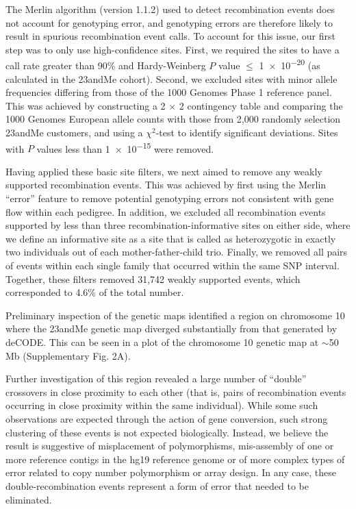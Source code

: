 The Merlin algorithm (version 1.1.2) used to detect recombination events does
not account for genotyping error, and genotyping errors are therefore likely to
result in spurious recombination event calls. To account for this issue, our first step
was to only use high-confidence sites. First, we required the sites to have a call rate
greater than 90\% and Hardy-Weinberg $P$ value $\le$ \num{1e-20} (as calculated in the
23andMe cohort). Second, we excluded sites with minor allele frequencies differing
from those of the 1000 Genomes Phase 1 reference panel\cite{1000G2012}. This was achieved by
constructing a 2 $\times$ 2 contingency table and comparing the 1000 Genomes
European allele counts with those from 2,000 randomly selection 23andMe
customers, and using a $\chi^2$-test to identify significant deviations. Sites with $P$ values
less than \num{1e-15} were removed.

Having applied these basic site filters, we next aimed to remove any weakly
supported recombination events. This was achieved by first using the Merlin ``error''
feature to remove potential genotyping errors not consistent with gene flow within
each pedigree. In addition, we excluded all recombination events supported by less
than three recombination-informative sites on either side, where we define an
informative site as a site that is called as heterozygotic in exactly two individuals
out of each mother-father-child trio. Finally, we removed all pairs of events within
each single family that occurred within the same SNP interval. Together, these
filters removed 31,742 weakly supported events, which corresponded to 4.6\% of the
total number.

Preliminary inspection of the genetic maps identified a region on chromosome
10 where the 23andMe genetic map diverged substantially from that generated by
deCODE\cite{Kong2010}. This can be seen in a plot of the chromosome 10 genetic map at
$\sim$50 Mb (Supplementary Fig. 2A).

Further investigation of this region revealed a large number of ``double''
crossovers in close proximity to each other (that is, pairs of recombination events
occurring in close proximity within the same individual). While some such
observations are expected through the action of gene conversion, such strong
clustering of these events is not expected biologically. Instead, we believe the result
is suggestive of misplacement of polymorphisms, mis-assembly of one or more
reference contigs in the hg19 reference genome or of more complex types of
error related to copy number polymorphism or array design. In any case, these
double-recombination events represent a form of error that needed to be
eliminated.

